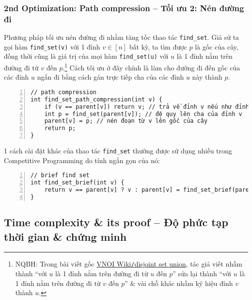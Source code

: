 \documentclass{article}
\begin{document}
\subsubsection{2nd Optimization: Path compression -- Tối ưu 2: Nén đường đi}
Phương pháp tối ưu nén đường đi nhằm tăng tốc thao tác \verb|find_set|. Giả sử ta gọi hàm \verb|find_set(v)| với 1 đỉnh $v\in[n]$ bất kỳ, ta tìm được $p$ là gốc của cây, đồng thời cũng là giá trị của mọi hàm \verb|find_set(u)| với $u$ là 1 đỉnh nằm trên đường đi từ $v$ đến $p$.\footnote{NQBH: Trong bài viết gốc \href{https://wiki.vnoi.info/algo/data-structures/disjoint-set-union}{VNOI Wiki{\tt/}disjoint set union}, tác giả viết nhầm thành ``với $u$ là 1 đỉnh nằm trên đường đi từ $u$ đến $p$'' sửa lại thành ``với $u$ là 1 đỉnh nằm trên đường đi từ $v$ đến $p$'' \& vài chỗ khác nhầm ký hiệu đỉnh $v$ thành $u$.} Cách tối ưu ở đây chính là làm cho đường đi đến gốc của các đỉnh $u$ ngắn đi bằng cách gán trực tiếp cha của các đỉnh $u$ này thành $p$.
\begin{Verbatim}[numbers=left,xleftmargin=5mm]
// path compression
int find_set_path_compression(int v) {
    if (v == parent[v]) return v; // trả về đỉnh v nếu như đỉnh v là gốc của cây
    int p = find_set(parent[v]); // đệ quy lên cha của đỉnh v
    parent[v] = p; // nén đoạn từ v lên gốc của cây
    return p;
}
\end{Verbatim}
1 cách cài đặt khác của thao tác \verb|find_set| thường được sử dụng nhiều trong Competitive Programming do tính ngắn gọn của nó:
\begin{Verbatim}[numbers=left,xleftmargin=5mm]
// brief find set
int find_set_brief(int v) {
    return v == parent[v] ? v : parent[v] = find_set_brief(parent[v]);
}
\end{Verbatim}


\subsection{Time complexity \& its proof -- Độ phức tạp thời gian \& chứng minh}

\end{document}

